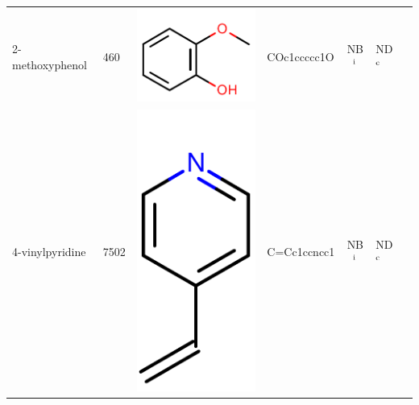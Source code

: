 \documentclass[aps,pre,twocolumn,nofootinbib,superscriptaddress,10pt, final,tightenlines]{revtex4-1}
\begin{document}
\begin{table}
\begin{center}
\begin{tabular}{llp{2cm}>{\ttfamily}lS[table-format=-1.2, table-figures-uncertainty=1]ll}
2-methoxyphenol                    & 460                                  & \parbox[c]{1em}{\includegraphics[scale=0.2]{figures/460.pdf}}      & COc1ccccc1O                          & {NB$^{\rm i}$}                                          & ND$^{\rm c}$                      & \cite{boyce_predicting_2009}  \\ %
4-vinylpyridine                    & 7502                                 & \parbox[c]{1em}{\includegraphics[scale=0.2]{figures/7502.pdf}}     & C=Cc1ccncc1                          & {NB$^{\rm i}$}                                          & ND$^{\rm c}$                      & \cite{wei_model_2002}         \\ 
\bottomrule
\end{tabular}                                                                                                                                                                                                                                                                                                       \\

\end{center}
\end{table}
\end{document}
